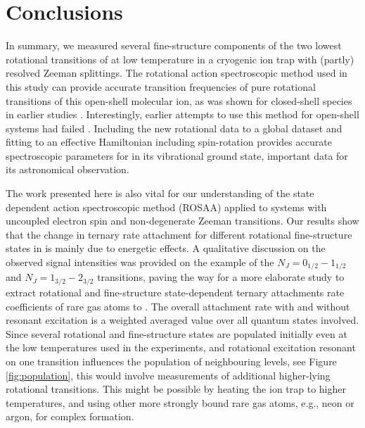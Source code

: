 
%        


\section{Conclusions}

In summary, we measured several fine-structure components of the two lowest rotational transitions of \co at low temperature in a cryogenic ion trap with (partly) resolved Zeeman splittings. The rotational action spectroscopic method used in this study can provide accurate transition frequencies of pure rotational transitions of this open-shell molecular ion,  as was shown for closed-shell species in earlier studies \cite{brunken_laboratory_2014, domenech2017, thorwirth_pure_2019, asvany_fundamental_2021}. Interestingly, earlier attempts to use this method for open-shell systems had failed \cite{kohguchi_high-resolution_2018, AMS2020}. Including the new rotational data to a global dataset and fitting to an effective Hamiltonian including spin-rotation provides accurate spectroscopic parameters for \co in its vibrational ground state, important data for its astronomical observation.

The work presented here is also vital for our understanding of the state dependent action spectroscopic method (ROSAA) applied to systems with uncoupled electron spin and non-degenerate Zeeman transitions. Our results show that the change in ternary rate attachment for different rotational fine-structure states in \co is mainly due to energetic effects. A qualitative discussion on the observed signal intensities was provided on the example of the $N_J=0_{1/2}-1_{1/2}$ and $N_J=1_{3/2}-2_{3/2}$ transitions, paving the way for a more elaborate study to extract rotational and fine-structure state-dependent ternary attachments rate coefficients of rare gas atoms to \con. The overall attachment rate with and without resonant excitation is a weighted averaged value over all quantum states involved. Since several rotational and fine-structure states are populated initially even at the low temperatures used in the experiments, and rotational excitation resonant on one transition influences the population of neighbouring levels, see Figure \ref{fig:population}, this would involve measurements of additional higher-lying rotational transitions. This might be possible by heating the ion trap to higher temperatures, and using other more strongly bound rare gas atoms, e.g., neon or argon, for complex formation. \\



